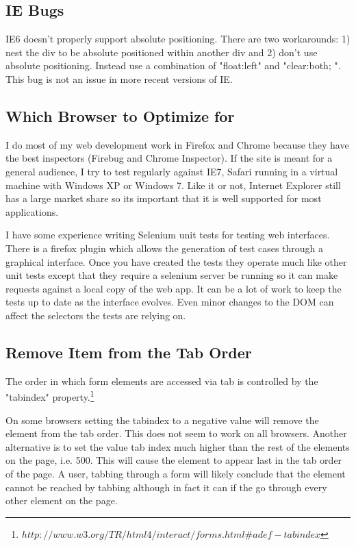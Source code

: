 \documentclass[12pt]{amsart}
\begin{document}
\subsection{IE Bugs}


IE6 doesn't properly support absolute positioning. There are two workarounds: 1) nest the div to be absolute positioned within another div and 2) don't use absolute positioning. Instead use a combination of "float:left" and "clear:both; ". This bug is not an issue in more recent versions of IE.


\subsection{Which Browser to Optimize for}

I do most of my web development work in Firefox and Chrome because they have the best inspectors (Firebug and Chrome Inspector). If the site is meant for a general audience, I try to test regularly against IE7, Safari running in a virtual machine with Windows XP or Windows 7. Like it or not, Internet Explorer still has a large market share so its important that it is well supported for most applications.

I have some experience writing Selenium unit tests for testing web interfaces. There is a firefox plugin which allows the generation of test cases through a graphical interface. Once you have created the tests they operate much like other unit tests except that they require a selenium server be running so it can make requests against a local copy of the web app. It can be a lot of work to keep the tests up to date as the interface evolves. Even minor changes to the DOM can affect the selectors the tests are relying on. 


\subsection{Remove Item from the Tab Order}

The order in which form elements are accessed via tab is controlled by the "tabindex" property.\footnote[4]{$http://www.w3.org/TR/html4/interact/forms.html\#adef-tabindex$}

On some browsers setting the tabindex to a negative value will remove the element from the tab order. This does not seem to work on all browsers. Another alternative is to set the value tab index much higher than the rest of the elements on the page, i.e. 500. This will cause the element to appear last in the tab order of the page. A user, tabbing through a form will likely conclude that the element cannot be reached by tabbing although in fact it can if the go through every other element on the page.
\end{document}
